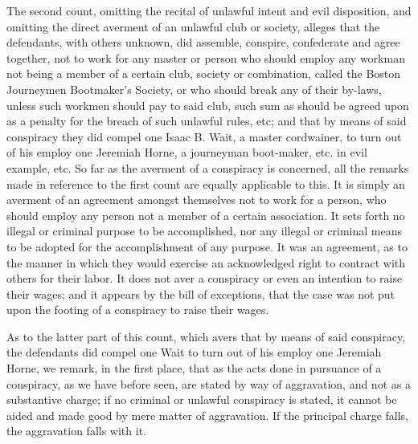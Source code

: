 \documentclass[
  letterpaper,
  11pt,
  DIV=9,
  openright]{scrbook}
\begin{document}
The second count, omitting the recital of unlawful intent and evil
disposition, and omitting the direct averment of an unlawful club or
society, alleges that the defendants, with others unknown, did assemble,
conspire, confederate and agree together, not to work for any master or
person who should employ any workman not being a member of a certain
club, society or combination, called the Boston Journeymen Bootmaker's
Society, or who should break any of their by-laws, unless such workmen
should pay to said club, such sum as should be agreed upon as a penalty
for the breach of such unlawful rules, etc; and that by means of said
conspiracy they did compel one Isaac B. Wait, a master cordwainer, to
turn out of his employ one Jeremiah Horne, a journeyman boot-maker, etc.
in evil example, etc. So far as the averment of a conspiracy is
concerned, all the remarks made in reference to the first count are
equally applicable to this. It is simply an averment of an agreement
amongst themselves not to work for a person, who should employ any
person not a member of a certain association. It sets forth no illegal
or criminal purpose to be accomplished, nor any illegal or criminal
means to be adopted for the accomplishment of any purpose. It was an
agreement, as to the manner in which they would exercise an acknowledged
right to contract with others for their labor. It does not aver a
conspiracy or even an intention to raise their wages; and it appears by
the bill of exceptions, that the case was not put upon the footing of a
conspiracy to raise their wages.

As to the latter part of this count, which avers that by means of said
conspiracy, the defendants did compel one Wait to turn out of his employ
one Jeremiah Horne, we remark, in the first place, that as the acts done
in pursuance of a conspiracy, as we have before seen, are stated by way
of aggravation, and not as a substantive charge; if no criminal or
unlawful conspiracy is stated, it cannot be aided and made good by mere
matter of aggravation. If the principal charge falls, the aggravation
falls with it.
\end{document}
